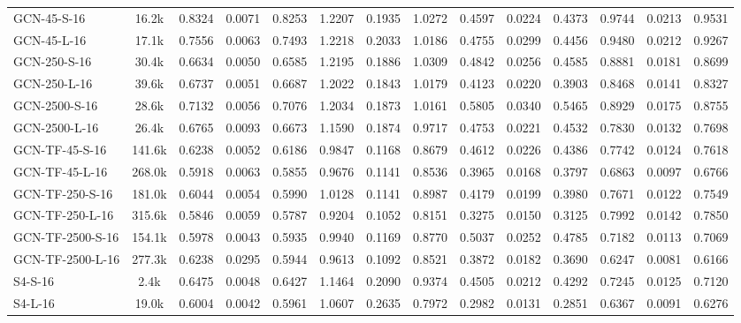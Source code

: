 \begin{table*}[h]
{\begin{tabular}{l c >{\columncolor{gray!20}}ccc >{\columncolor{gray!20}}ccc >{\columncolor{gray!20}}ccc >{\columncolor{gray!20}}ccc}
            \hline
            GCN-45-S-16 & 16.2k & 0.8324 & 0.0071 & 0.8253 & 1.2207 & 0.1935 & 1.0272 & 0.4597 & 0.0224 & 0.4373 & 0.9744 & 0.0213 & 0.9531 \\
            GCN-45-L-16 & 17.1k & 0.7556 & 0.0063 & 0.7493 & 1.2218 & 0.2033 & 1.0186 & 0.4755 & 0.0299 & 0.4456 & 0.9480 & 0.0212 & 0.9267 \\
            GCN-250-S-16 & 30.4k & 0.6634 & 0.0050 & 0.6585 & 1.2195 & 0.1886 & 1.0309 & 0.4842 & 0.0256 & 0.4585 & 0.8881 & 0.0181 & 0.8699 \\
            GCN-250-L-16 & 39.6k & 0.6737 & 0.0051 & 0.6687 & 1.2022 & 0.1843 & 1.0179 & 0.4123 & 0.0220 & 0.3903 & 0.8468 & 0.0141 & 0.8327 \\
            GCN-2500-S-16 & 28.6k & 0.7132 & 0.0056 & 0.7076 & 1.2034 & 0.1873 & 1.0161 & 0.5805 & 0.0340 & 0.5465 & 0.8929 & 0.0175 & 0.8755 \\
            GCN-2500-L-16 & 26.4k & 0.6765 & 0.0093 & 0.6673 & 1.1590 & 0.1874 & 0.9717 & 0.4753 & 0.0221 & 0.4532 & 0.7830 & 0.0132 & 0.7698 \\
            \hline
            GCN-TF-45-S-16 & 141.6k & 0.6238 & 0.0052 & 0.6186 & 0.9847 & 0.1168 & 0.8679 & 0.4612 & 0.0226 & 0.4386 & 0.7742 & 0.0124 & 0.7618 \\
            GCN-TF-45-L-16 & 268.0k & 0.5918 & 0.0063 & 0.5855 & 0.9676 & 0.1141 & 0.8536 & 0.3965 & 0.0168 & 0.3797 & 0.6863 & 0.0097 & 0.6766 \\
            GCN-TF-250-S-16 & 181.0k & 0.6044 & 0.0054 & 0.5990 & 1.0128 & 0.1141 & 0.8987 & 0.4179 & 0.0199 & 0.3980 & 0.7671 & 0.0122 & 0.7549 \\
            GCN-TF-250-L-16 & 315.6k & 0.5846 & 0.0059 & 0.5787 & 0.9204 & 0.1052 & 0.8151 & 0.3275 & 0.0150 & 0.3125 & 0.7992 & 0.0142 & 0.7850 \\
            GCN-TF-2500-S-16 & 154.1k & 0.5978 & 0.0043 & 0.5935 & 0.9940 & 0.1169 & 0.8770 & 0.5037 & 0.0252 & 0.4785 & 0.7182 & 0.0113 & 0.7069 \\
            GCN-TF-2500-L-16 & 277.3k & 0.6238 & 0.0295 & 0.5944 & 0.9613 & 0.1092 & 0.8521 & 0.3872 & 0.0182 & 0.3690 & 0.6247 & 0.0081 & 0.6166 \\
            \hline
            S4-S-16 & 2.4k & 0.6475 & 0.0048 & 0.6427 & 1.1464 & 0.2090 & 0.9374 & 0.4505 & 0.0212 & 0.4292 & 0.7245 & 0.0125 & 0.7120 \\
            S4-L-16 & 19.0k & 0.6004 & 0.0042 & 0.5961 & 1.0607 & 0.2635 & 0.7972 & 0.2982 & 0.0131 & 0.2851 & 0.6367 & 0.0091 & 0.6276 \\

\end{tabular}}
\end{table*}

